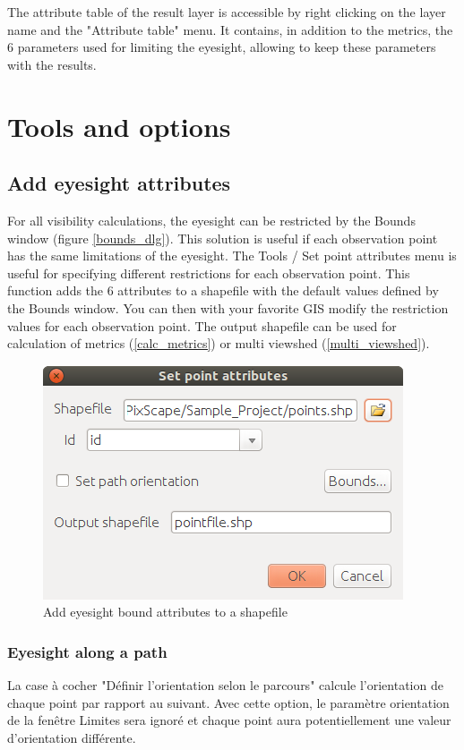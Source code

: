 \documentclass{report}
\begin{document}
The attribute table of the result layer is accessible by right clicking on the layer name and the "Attribute table" menu. It contains, in addition to the metrics, the 6 parameters used for limiting the eyesight, allowing to keep these parameters with the results.

\section{Tools and options}
\label{tools}

\subsection{Add eyesight attributes}
\label{add_attributes}
For all visibility calculations, the eyesight can be restricted by the Bounds window (figure \ref{bounds_dlg}). This solution is useful if each observation point has the same limitations of the eyesight.
The Tools / Set point attributes menu is useful for specifying different restrictions for each observation point. This function adds the 6 attributes to a shapefile with the default values defined by the Bounds window. You can then with your favorite GIS modify the restriction values for each observation point.
The output shapefile can be used for calculation of metrics (\ref{calc_metrics}) or multi viewshed (\ref{multi_viewshed}).

\begin{figure}[H]
	\includegraphics[scale=0.5]{img/add_attributes-en.png} 
	\caption{Add eyesight bound attributes to a shapefile}
	\label{add_attributes_dlg}
\end{figure}

\subsubsection{Eyesight along a path}
La case à cocher "Définir l'orientation selon le parcours" calcule l'orientation de chaque point par rapport au suivant. Avec cette option, le paramètre orientation de la fenêtre Limites sera ignoré et chaque point aura potentiellement une valeur d'orientation différente. 
\end{document}
